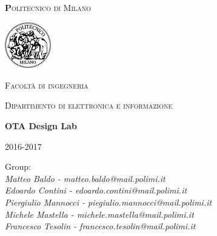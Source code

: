 \begin{titlepage}

	\centering
	{\scshape\huge\textbf Politecnico di Milano \par}
	\vspace{0.5cm}

	\includegraphics[width=0.15\textwidth]{Immagini/logo.png}\par\vspace{0.2cm}
	
	{\scshape\small Facoltà di ingegneria\par}
	{\scshape\small Dipartimento di elettronica e informazione\par}
	\vspace{1.5cm}
	{\huge\bfseries OTA Design Lab\par}
	\vspace{1.5cm}
	{\scshape \par}
	{\scshape\small 2016-2017 \par}
	\vspace{2cm}
	\vfill
	
	\raggedright
    {Group:\\ \textit{Matteo Baldo - matteo.baldo@mail.polimi.it \\ Edoardo Contini - edoardo.contini@mail.polimi.it \\ Piergiulio Mannocci - piegiulio.mannocci@mail.polimi.it \\ Michele Mastella - michele.mastella@mail.polimi.it \\ Francesco Tesolin - francesco.tesolin@mail.polimi.it }
	
	}\vfill
	
	\end{titlepage}
